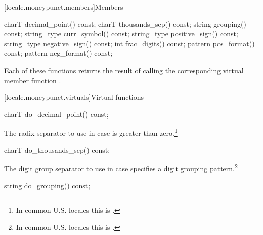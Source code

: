 [locale.moneypunct.members]{Members}

%
%
%
%
%
%
%
%
%
\begin{codeblock}
charT        decimal_point() const;
charT        thousands_sep() const;
string       grouping()      const;
string_type  curr_symbol()   const;
string_type  positive_sign() const;
string_type  negative_sign() const;
int          frac_digits()   const;
pattern      pos_format()    const;
pattern      neg_format()    const;
\end{codeblock}

\pnum
Each of these functions 
returns the result of calling the corresponding
virtual member function
.

[locale.moneypunct.virtuals]{Virtual functions}

%
\begin{itemdecl}
charT do_decimal_point() const;
\end{itemdecl}

\begin{itemdescr}
\pnum
\returns
The radix separator to use in case
is greater than zero.\footnote{In common U.S. locales this is
.}
\end{itemdescr}

%
\begin{itemdecl}
charT do_thousands_sep() const;
\end{itemdecl}

\begin{itemdescr}
\pnum
\returns
The digit group separator to use in case
specifies a digit grouping pattern.\footnote{In common U.S. locales this is
.}
\end{itemdescr}

%
\begin{itemdecl}
string do_grouping() const;
\end{itemdecl}

